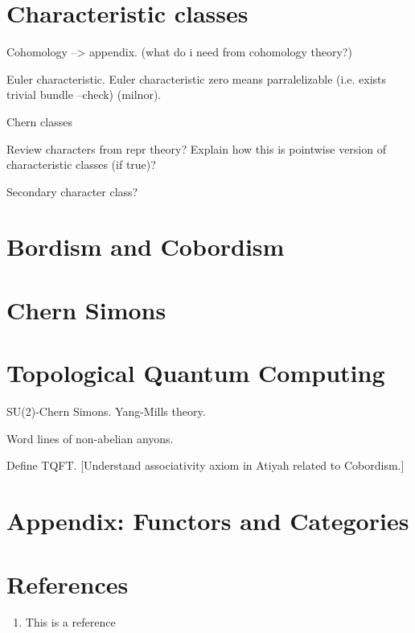 \documentclass[a4paper]{article}
\theoremstyle{definition} \newtheorem*{definition}{Definition}
\theoremstyle{definition} \newtheorem*{definitions}{Definitions}
\theoremstyle{plain} \newtheorem{theorem}{Theorem}[section]
\theoremstyle{plain} \newtheorem{proposition}[theorem]{Proposition}
\theoremstyle{plain} \newtheorem{corollary}[theorem]{Corollary}
\theoremstyle{plain} \newtheorem{lemma}[theorem]{Lemma}
\theoremstyle{plain} \newtheorem{example}[theorem]{Example}
\begin{document}
\section{Characteristic classes}
Cohomology --> appendix. (what do i need from cohomology theory?)

Euler characteristic. Euler characteristic zero means parralelizable (i.e. exists trivial bundle --check) (milnor).

Chern classes

Review characters from repr theory? Explain how this is pointwise version of characteristic classes (if true)?

Secondary character class?

\section{Bordism and Cobordism}

\section{Chern Simons}


\section{Topological Quantum Computing}
SU(2)-Chern Simons. Yang-Mills theory.

Word lines of non-abelian anyons.

Define TQFT. [Understand associativity axiom in Atiyah related to Cobordism.]

\section{Appendix: Functors and Categories}

\section*{References}
\begin{enumerate}
\item This is a reference
\end{enumerate}
\end{document}
